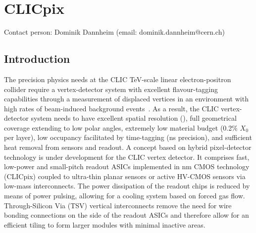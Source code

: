 \section{CLICpix}
Contact person: Dominik Dannheim (email: dominik.dannheim@cern.ch)

\subsection{Introduction}
 The precision physics needs at the CLIC TeV-scale linear electron-positron collider
require a vertex-detector system with excellent flavour-tagging capabilities through
a measurement of displaced vertices in an environment with high rates
of beam-induced background events~\cite{Miyamoto:1425915}.
As a result, the CLIC vertex-detector system needs to have excellent spatial resolution
(\unit[3]{\micron}),
full geometrical coverage extending to low polar angles, extremely low material budget
(0.2\% $X_0$ per layer),
low occupancy facilitated by time-tagging (\unit[10]{ns} precision), and sufficient heat
removal from sensors and readout.
A concept based on hybrid pixel-detector technology is under development
for the CLIC vertex detector. It comprises fast, low-power and small-pitch readout
ASICs implemented in \unit[65]{nm} CMOS technology (CLICpix) coupled to ultra-thin planar sensors
or active HV-CMOS sensors via low-mass interconnects. The power dissipation of the
readout chips is reduced by means of power pulsing, allowing for a cooling system
based on forced gas flow. Through-Silicon Via (TSV) vertical interconnects remove the need for wire
bonding connections on the side of the readout ASICs
and therefore allow for an efficient tiling to form larger modules with minimal
inactive areas.

